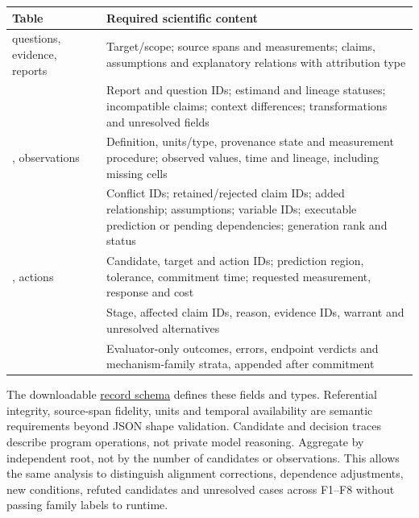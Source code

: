 \documentclass[11pt,a4paper]{article}
\newcommand{\CNSIdentifier}[1]{{\small\ttfamily\def\_{\textunderscore\allowbreak}#1}}
\begin{document}
\begin{longtable}[]{@{}
  >{\raggedright\arraybackslash}p{}
  >{\raggedright\arraybackslash}p{}@{}}
\toprule\noalign{}
\begin{minipage}[b]{\linewidth}\raggedright
Table
\end{minipage} & \begin{minipage}[b]{\linewidth}\raggedright
Required scientific content
\end{minipage} \\
\midrule\noalign{}
\endhead
\bottomrule\noalign{}
\endlastfoot
\CNSIdentifier{questions}, \CNSIdentifier{evidence}, \CNSIdentifier{reports} & Target/scope;
source spans and measurements; claims, assumptions and explanatory
relations with attribution type \\
\CNSIdentifier{conflicts} & Report and question IDs; estimand and lineage
statuses; incompatible claims; context differences; transformations and
unresolved fields \\
\CNSIdentifier{variables}, \CNSIdentifier{observations} & Definition, units/type,
provenance state and measurement procedure; observed values, time and
lineage, including missing cells \\
\CNSIdentifier{candidates} & Conflict IDs; retained/rejected claim IDs; added
relationship; assumptions; variable IDs; executable prediction or
pending dependencies; generation rank and status \\
\CNSIdentifier{predictions}, \CNSIdentifier{actions} & Candidate, target and action
IDs; prediction region, tolerance, commitment time; requested
measurement, response and cost \\
\CNSIdentifier{decisions} & Stage, affected claim IDs, reason, evidence IDs,
warrant and unresolved alternatives \\
\CNSIdentifier{scores} & Evaluator-only outcomes, errors, endpoint verdicts and
mechanism-family strata, appended after commitment \\
\end{longtable}

The downloadable
\href{https://gtcode.com/papers/trace/trace-records.schema.json}{record
schema} defines these fields and types. Referential integrity,
source-span fidelity, units and temporal availability are semantic
requirements beyond JSON shape validation. Candidate and decision traces
describe program operations, not private model reasoning. Aggregate by
independent root, not by the number of candidates or observations. This
allows the same analysis to distinguish alignment corrections,
dependence adjustments, new conditions, refuted candidates and
unresolved cases across F1--F8 without passing family labels to runtime.
\end{document}
